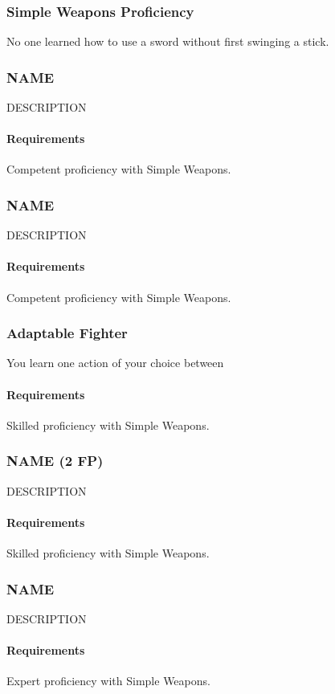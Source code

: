 \subsubsection{Simple Weapons Proficiency} \label{feat::name}
    No one learned how to use a sword without first swinging a stick.
\subsubsection{NAME} \label{feat::name}
    DESCRIPTION
    \paragraph{Requirements} Competent proficiency with Simple Weapons.
\subsubsection{NAME} \label{feat::name}
    DESCRIPTION
    \paragraph{Requirements} Competent proficiency with Simple Weapons.
\subsubsection{Adaptable Fighter} \label{feat::adaptablefighter}
    You learn one action of your choice between %
    \paragraph{Requirements} Skilled proficiency with Simple Weapons.
\subsubsection{NAME (2 FP)} \label{feat::name}
    DESCRIPTION
    \paragraph{Requirements} Skilled proficiency with Simple Weapons.
\subsubsection{NAME} \label{feat::name}
    DESCRIPTION
    \paragraph{Requirements} Expert proficiency with Simple Weapons.
